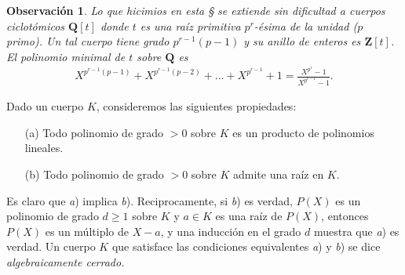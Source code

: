 \documentclass[10pt,oneside,bibtotoc,smallheadings,leqno,a5paper,DIV=12]{scrbook}
\newcommand{\QQ}{\mathbf{Q}}
\newcommand{\ZZ}{\mathbf{Z}}
\numberwithin{equation}{section}
\theoremstyle{defi}
\theoremstyle{enonce}
\theoremstyle{rem}
\newtheorem*{remark*}{Observaci\'on}
\numberwithin{theorem}{section}
\numberwithin{proposition}{section}
\numberwithin{definition}{section}
\numberwithin{lemma}{section}
\numberwithin{corollary}{section}
\numberwithin{example}{section}
\numberwithin{footnote}{section}%
\begin{document}
\begin{remark*}
Lo que hicimios en esta \S{} se extiende sin dificultad a cuerpos ciclot\'omicos $\QQ[t]$ donde $t$ es una
ra\'iz primitiva $p^{r}$-\'esima de la unidad ($p$ primo). Un tal cuerpo tiene grado $p^{r-1}(p-1)$ y su
anillo de enteros es $\ZZ[t]$. El polinomio minimal de $t$ sobre $\QQ$ es
\begin{gather*}
X^{p^{r-1}(p-1)}+X^{p^{r-1}(p-2)}+\dots+X^{p^{r-1}}+1=\frac{X^{p^{r}}-1}{X^{p^{r-1}}-1}.
\end{gather*}
\end{remark*}

%

Dado un cuerpo $K$, consideremos las siguientes propiedades:
\begin{enumerate}
\item[(a)] Todo polinomio de grado $>0$ sobre $K$ es un producto de polinomios lineales.
\item[(b)] Todo polinomio de grado $>0$ sobre $K$ admite una ra\'iz en $K$.
\end{enumerate}
Es claro que {\itshape a}) implica {\itshape b}). Reciprocamente, si {\itshape b}) es verdad,
$P(X)$ es un polinomio de grado $d\geq 1$ sobre $K$ y $a\in K$ es una ra\'iz de $P(X)$, entonces
$P(X)$ es un m\'ultiplo de $X-a$, y una inducci\'on en el grado $d$ muestra que {\itshape a}) es verdad.
Un cuerpo $K$ que satisface las condiciones equivalentes {\itshape a}) y {\itshape b}) se dice
{\em algebraicamente cerrado.}
\end{document}

